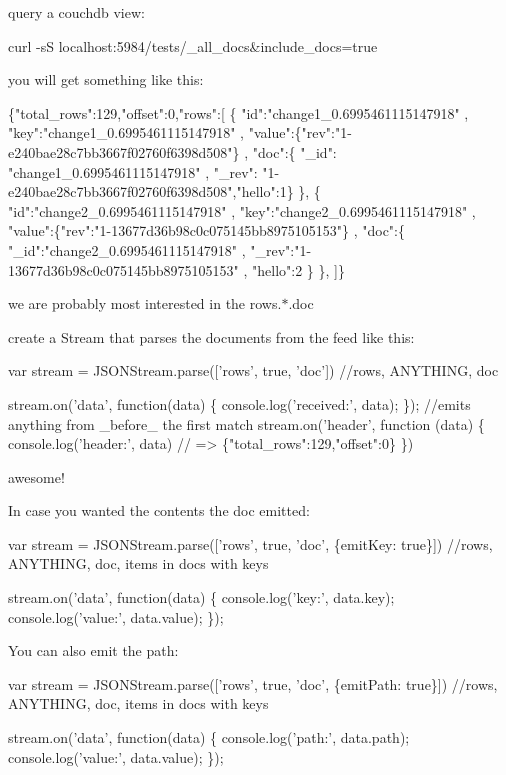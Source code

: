 query a couchdb view\+:


\begin{DoxyCode}
curl -sS localhost:5984/tests/\_all\_docs&include\_docs=true
\end{DoxyCode}
 you will get something like this\+:


\begin{DoxyCode}
\{"total\_rows":129,"offset":0,"rows":[
  \{ "id":"change1\_0.6995461115147918"
  , "key":"change1\_0.6995461115147918"
  , "value":\{"rev":"1-e240bae28c7bb3667f02760f6398d508"\}
  , "doc":\{
      "\_id":  "change1\_0.6995461115147918"
    , "\_rev": "1-e240bae28c7bb3667f02760f6398d508","hello":1\}
  \},
  \{ "id":"change2\_0.6995461115147918"
  , "key":"change2\_0.6995461115147918"
  , "value":\{"rev":"1-13677d36b98c0c075145bb8975105153"\}
  , "doc":\{
      "\_id":"change2\_0.6995461115147918"
    , "\_rev":"1-13677d36b98c0c075145bb8975105153"
    , "hello":2
    \}
  \},
]\}
\end{DoxyCode}


we are probably most interested in the {\ttfamily rows.$\ast$.doc}

create a {\ttfamily Stream} that parses the documents from the feed like this\+:


\begin{DoxyCode}
var stream = JSONStream.parse(['rows', true, 'doc']) //rows, ANYTHING, doc

stream.on('data', function(data) \{
  console.log('received:', data);
\});
//emits anything from \_before\_ the first match
stream.on('header', function (data) \{
  console.log('header:', data) // => \{"total\_rows":129,"offset":0\}
\})
\end{DoxyCode}
 awesome!

In case you wanted the contents the doc emitted\+:


\begin{DoxyCode}
var stream = JSONStream.parse(['rows', true, 'doc', \{emitKey: true\}]) //rows, ANYTHING, doc, items in docs
       with keys

stream.on('data', function(data) \{
  console.log('key:', data.key);
  console.log('value:', data.value);
\});
\end{DoxyCode}


You can also emit the path\+:


\begin{DoxyCode}
var stream = JSONStream.parse(['rows', true, 'doc', \{emitPath: true\}]) //rows, ANYTHING, doc, items in docs
       with keys

stream.on('data', function(data) \{
  console.log('path:', data.path);
  console.log('value:', data.value);
\});
\end{DoxyCode}


